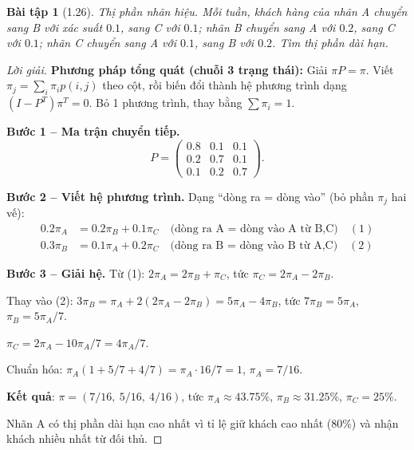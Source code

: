 \documentclass[8pt,a4paper]{article}
\newtheorem{exercise}{Bài tập}
\newenvironment{solution}{\begin{proof}[Lời giải]}{\end{proof}}
\begin{document}
\begin{exercise}[1.26]
Thị phần nhãn hiệu. Mỗi tuần, khách hàng của nhãn A chuyển sang B với xác suất $0.1$, sang C với $0.1$; nhãn B chuyển sang A với $0.2$, sang C với $0.1$; nhãn C chuyển sang A với $0.1$, sang B với $0.2$. Tìm thị phần dài hạn.
\end{exercise}
\begin{solution}
\textbf{Phương pháp tổng quát (chuỗi 3 trạng thái):} Giải $\pi P = \pi$. Viết $\pi_j = \sum_i \pi_i p(i,j)$ theo cột, rồi biến đổi thành hệ phương trình dạng $(I - P^T)\pi^T = 0$. Bỏ 1 phương trình, thay bằng $\sum \pi_i = 1$.

\textbf{Bước 1 -- Ma trận chuyển tiếp.}
\[
  P = \begin{pmatrix} 0.8 & 0.1 & 0.1 \\ 0.2 & 0.7 & 0.1 \\ 0.1 & 0.2 & 0.7 \end{pmatrix}.
\]

\textbf{Bước 2 -- Viết hệ phương trình.}
Dạng ``dòng ra = dòng vào'' (bỏ phần $\pi_j$ hai vế):
\begin{align*}
  0.2\pi_A &= 0.2\pi_B + 0.1\pi_C \quad \text{(dòng ra A = dòng vào A từ B,C)} \quad (1)\\
  0.3\pi_B &= 0.1\pi_A + 0.2\pi_C \quad \text{(dòng ra B = dòng vào B từ A,C)} \quad (2)
\end{align*}

\textbf{Bước 3 -- Giải hệ.}
Từ (1): $2\pi_A = 2\pi_B + \pi_C$, tức $\pi_C = 2\pi_A - 2\pi_B$.

Thay vào (2): $3\pi_B = \pi_A + 2(2\pi_A - 2\pi_B) = 5\pi_A - 4\pi_B$, tức $7\pi_B = 5\pi_A$, $\pi_B = 5\pi_A/7$.

$\pi_C = 2\pi_A - 10\pi_A/7 = 4\pi_A/7$.

Chuẩn hóa: $\pi_A(1 + 5/7 + 4/7) = \pi_A \cdot 16/7 = 1$, $\pi_A = 7/16$.

\textbf{Kết quả}: $\pi = (7/16,\ 5/16,\ 4/16)$, tức $\pi_A \approx 43.75\%$, $\pi_B \approx 31.25\%$, $\pi_C = 25\%$.

Nhãn A có thị phần dài hạn cao nhất vì tỉ lệ giữ khách cao nhất (80\%) và nhận khách nhiều nhất từ đối thủ.
\end{solution}
\end{document}
